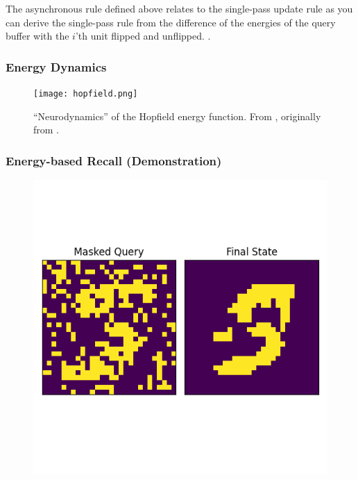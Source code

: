 \documentclass{beamer}
\begin{document}
\begin{frame}
    \begin{fact}
        The asynchronous rule defined above relates to the single-pass update
        rule as you can derive the single-pass rule from the difference of 
        the energies of the query buffer with the $i$'th unit flipped and unflipped.
        \parencite{krotov_modern_2025,mimura_dynamical_2025}.
    \end{fact}
\end{frame}

\begin{frame}
\frametitle{Energy Dynamics}

    \begin{figure}
        \centering
        \texttt{[image: hopfield.png]}
        \caption{``Neurodynamics'' of the Hopfield energy function. From \textcite{haykin_neural_2009},
        originally from \textcite{hopfield_neurons_1984}.}
    \end{figure}

\end{frame}

\begin{frame}
\frametitle{Energy-based Recall (Demonstration)}

\centering
\begin{figure}
\includegraphics[width=\textwidth, height=\textheight]{hopfield_recall_states.png}
\end{figure}

\end{frame}
\end{document}
